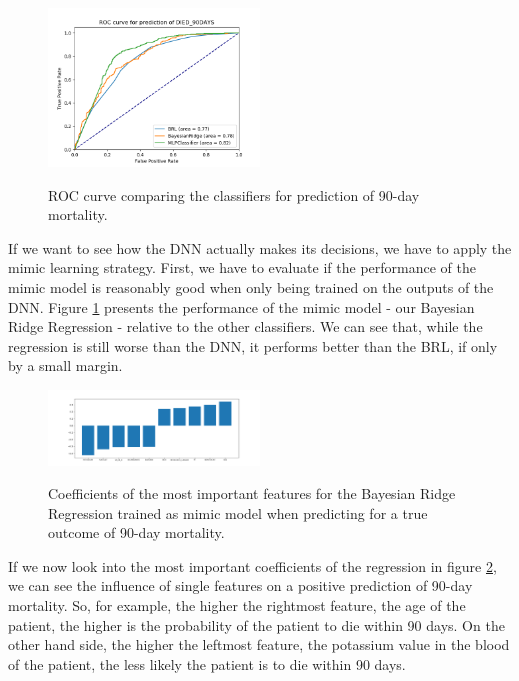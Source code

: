 \documentclass[conference,comsoc]{IEEEtran}
\begin{document}
\begin{figure}[h]
	\includegraphics[width=0.5\textwidth]{ROC_DIED_90DAYS.png}
	\label{fig:mortalityROC}
	\caption{ROC curve comparing the classifiers for prediction of 90-day mortality.}
\end{figure}

If we want to see how the DNN actually makes its decisions, we have to apply the mimic learning strategy.
First, we have to evaluate if the performance of the mimic model is reasonably good when only being trained on the outputs of the DNN.
Figure \ref{fig:mortalityROC} presents the performance of the mimic model - our Bayesian Ridge Regression - relative to the other classifiers.
We can see that, while the regression is still worse than the DNN, it performs better than the BRL, if only by a small margin. \\

\begin{figure}[h]
	\includegraphics[width=0.5\textwidth]{coef_DIED_90DAYS.png}
	\label{fig:mortalityCOEF}
	\caption{Coefficients of the most important features for the Bayesian Ridge Regression trained as mimic model when predicting for a true outcome of 90-day mortality.}
\end{figure}

If we now look into the most important coefficients of the regression in figure \ref{fig:mortalityCOEF}, we can see the influence of single features on a positive prediction of 90-day mortality.
So, for example, the higher the rightmost feature, the age of the patient, the higher is the probability of the patient to die within 90 days.
On the other hand side, the higher the leftmost feature, the potassium value in the blood of the patient, the less likely the patient is to die within 90 days.
\end{document}
